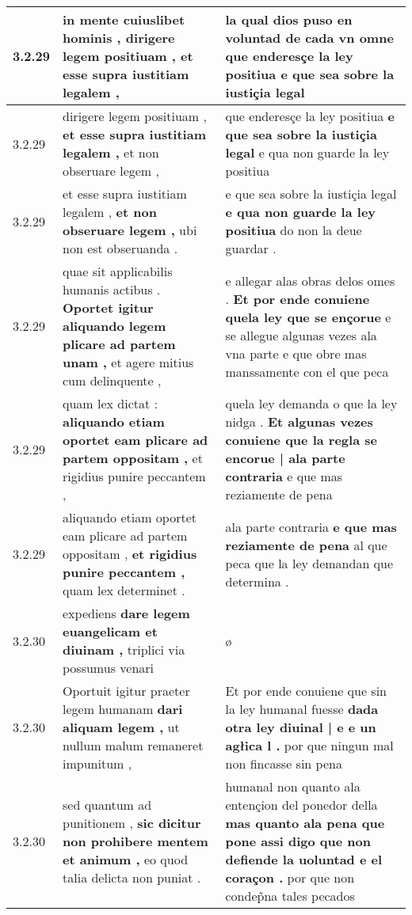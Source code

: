 \begin{tabular}{|p{1cm}|p{6.5cm}|p{6.5cm}|}
3.2.29 & in mente cuiuslibet hominis , \textbf{ dirigere legem positiuam , } et esse supra iustitiam legalem , & la qual dios puso en voluntad de cada vn omne \textbf{ que enderesçe la ley positiua } e que sea sobre la iustiçia legal \\\hline
3.2.29 & dirigere legem positiuam , \textbf{ et esse supra iustitiam legalem , } et non obseruare legem , & que enderesçe la ley positiua \textbf{ e que sea sobre la iustiçia legal } e qua non guarde la ley positiua \\\hline
3.2.29 & et esse supra iustitiam legalem , \textbf{ et non obseruare legem , } ubi non est obseruanda . & e que sea sobre la iustiçia legal \textbf{ e qua non guarde la ley positiua } do non la deue guardar . \\\hline
3.2.29 & quae sit applicabilis humanis actibus . \textbf{ Oportet igitur aliquando legem plicare ad partem unam , } et agere mitius cum delinquente , & e allegar alas obras delos omes . \textbf{ Et por ende conuiene quela ley que se ençorue } e se allegue algunas vezes ala vna parte e que obre mas manssamente con el que peca \\\hline
3.2.29 & quam lex dictat : \textbf{ aliquando etiam oportet eam plicare ad partem oppositam , } et rigidius punire peccantem , & quela ley demanda o que la ley nidga . \textbf{ Et algunas vezes conuiene que la regla se encorue | ala parte contraria } e que mas reziamente de pena \\\hline
3.2.29 & aliquando etiam oportet eam plicare ad partem oppositam , \textbf{ et rigidius punire peccantem , } quam lex determinet . & ala parte contraria \textbf{ e que mas reziamente de pena } al que peca que la ley demandan que determina . \\\hline
3.2.30 & expediens \textbf{ dare legem euangelicam et diuinam , } triplici via possumus venari & ø \\\hline
3.2.30 & Oportuit igitur praeter legem humanam \textbf{ dari aliquam legem , } ut nullum malum remaneret impunitum , & Et por ende conuiene que sin la ley humanal fuesse \textbf{ dada otra ley diuinal | e e un agłica l . } por que ningun mal non fincasse sin pena \\\hline
3.2.30 & sed quantum ad punitionem , \textbf{ sic dicitur non prohibere mentem et animum , } eo quod talia delicta non puniat . & humanal non quanto ala entençion del ponedor della \textbf{ mas quanto ala pena que pone assi digo que non defiende la uoluntad e el coraçon . } por que non condep̃na tales pecados \\\hline

\end{tabular}
